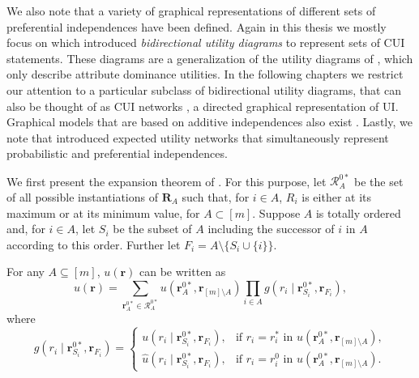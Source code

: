 We also note  that a variety of graphical representations of different sets of preferential independences have been defined. Again in this thesis we  mostly focus on \citet{Abbas2010} which introduced \textit{bidirectional utility diagrams} to represent sets of \gls{CUI} statements. These diagrams are a generalization of the utility diagrams of \citet{Abbas2005}, which only describe attribute dominance utilities. In the following chapters we  restrict our attention to a particular subclass of bidirectional utility diagrams, that can also be thought of as \gls{CUI} networks \citep{Engel2008}, a directed graphical representation of \gls{UI}. Graphical models that are based on additive independences also exist \citep{Bacchus1995, Braziunas2005}. Lastly, we note that \citet{Mura99} introduced expected utility networks that simultaneously represent probabilistic and preferential independences. 


We first present the expansion theorem of \citet{Abbas2010}. For this purpose, let $\bm{\mathcal{R}}_A^{0*}$ be the set of all possible instantiations of $\bm{R}_A$ such that, for $i\in A$, $R_i$ is either at its maximum or at its minimum value, for $A\subset [m]$. Suppose $A$ is totally ordered and, for $i\in A$, let $S_i$ be the subset of $A$ including the successor of $i$ in $A$ according to this order. Further let $F_i=A\setminus \{S_i\cup \{i\}\}$.

\begin{proposition}
\label{prop:utexpansion}
For any $A\subseteq[m]$, $u(\bm{r})$ can be written as
\begin{equation}
\label{eq:genut}
u(\bm{r})=\sum_{\bm{r}_A^{0*}\in \bm{\mathcal{R}}_A^{0*}}u(\bm{r}_A^{0*},\bm{r}_{[m]\setminus A})\prod_{i\in A}g(r_i\;|\; \bm{r}_{S_i}^{0*},\bm{r}_{F_i}),
\end{equation}
where 
\begin{equation*}
g(r_i\;|\; \bm{r}_{S_i}^{0*},\bm{r}_{F_i})=\left\{
\begin{array}{ll}
u(r_i\;|\; \bm{r}_{S_i}^{0*},\bm{r}_{F_i}),& \mbox{if } r_i=r_i^* \mbox{ in } u(\bm{r}_A^{0*},\bm{r}_{[m]\setminus A}) ,\\
\hat{u}(r_i\;|\; \bm{r}_{S_i}^{0*},\bm{r}_{F_i}),&\mbox{if } r_i=r_i^0 \mbox{ in } u(\bm{r}_A^{0*},\bm{r}_{[m]\setminus A}).
\end{array}
\right.
\end{equation*}
\end{proposition}

